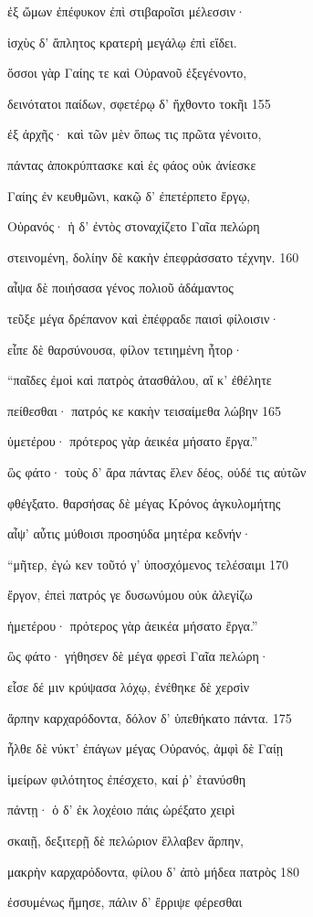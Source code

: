 ἐξ ὤμων ἐπέφυκον ἐπὶ στιβαροῖσι μέλεσσιν· 

ἰσχὺς δ' ἄπλητος κρατερὴ μεγάλῳ ἐπὶ εἴδει.

ὅσσοι γὰρ Γαίης τε καὶ Οὐρανοῦ ἐξεγένοντο,

δεινότατοι παίδων, σφετέρῳ δ' ἤχθοντο τοκῆι \num{155}

ἐξ ἀρχῆς· καὶ τῶν μὲν ὅπως τις πρῶτα γένοιτο, 

πάντας ἀποκρύπτασκε καὶ ἐς φάος οὐκ ἀνίεσκε

Γαίης ἐν κευθμῶνι, κακῷ δ' ἐπετέρπετο ἔργῳ, 

Οὐρανός· ἡ δ' ἐντὸς στοναχίζετο Γαῖα πελώρη

στεινομένη, δολίην δὲ κακὴν ἐπεφράσσατο τέχνην. \num{160}

αἶψα δὲ ποιήσασα γένος πολιοῦ ἀδάμαντος

τεῦξε μέγα δρέπανον καὶ ἐπέφραδε παισὶ φίλοισιν· 

εἶπε δὲ θαρσύνουσα, φίλον τετιημένη ἦτορ·

``παῖδες ἐμοὶ καὶ πατρὸς ἀτασθάλου, αἴ κ' ἐθέλητε

πείθεσθαι· πατρός κε κακὴν τεισαίμεθα λώβην \num{165}

ὑμετέρου· πρότερος γὰρ ἀεικέα μήσατο ἔργα.'' 

ὣς φάτο· τοὺς δ' ἄρα πάντας ἕλεν δέος, οὐδέ τις αὐτῶν

φθέγξατο. θαρσήσας δὲ μέγας Κρόνος ἀγκυλομήτης

αἶψ' αὖτις μύθοισι προσηύδα μητέρα κεδνήν·

``μῆτερ, ἐγώ κεν τοῦτό γ' ὑποσχόμενος τελέσαιμι \num{170} 

ἔργον, ἐπεὶ πατρός γε δυσωνύμου οὐκ ἀλεγίζω

ἡμετέρου· πρότερος γὰρ ἀεικέα μήσατο ἔργα.''

ὣς φάτο· γήθησεν δὲ μέγα φρεσὶ Γαῖα πελώρη· 

εἷσε δέ μιν κρύψασα λόχῳ, ἐνέθηκε δὲ χερσὶν 

ἅρπην καρχαρόδοντα, δόλον δ' ὑπεθήκατο πάντα. \num{175} 

ἦλθε δὲ νύκτ' ἐπάγων μέγας Οὐρανός, ἀμφὶ δὲ Γαίῃ

ἱμείρων φιλότητος ἐπέσχετο, καί ῥ' ἐτανύσθη

πάντῃ· ὁ δ' ἐκ λοχέοιο πάις ὠρέξατο χειρὶ

σκαιῇ, δεξιτερῇ δὲ πελώριον ἔλλαβεν ἅρπην,

μακρὴν καρχαρόδοντα, φίλου δ' ἀπὸ μήδεα πατρὸς \num{180}

ἐσσυμένως ἤμησε, πάλιν δ' ἔρριψε φέρεσθαι

